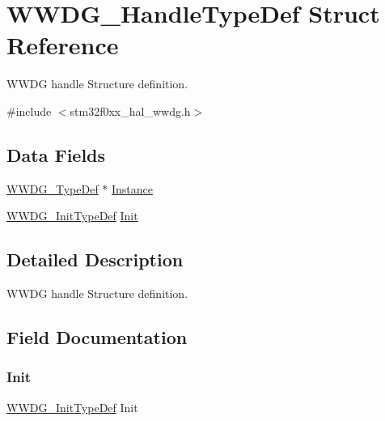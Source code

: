 \hypertarget{struct_w_w_d_g___handle_type_def}{}\section{W\+W\+D\+G\+\_\+\+Handle\+Type\+Def Struct Reference}
\label{struct_w_w_d_g___handle_type_def}


W\+W\+DG handle Structure definition.  




{\ttfamily \#include $<$stm32f0xx\+\_\+hal\+\_\+wwdg.\+h$>$}

\subsection*{Data Fields}
\begin{DoxyCompactItemize}
\item 
\hyperlink{struct_w_w_d_g___type_def}{W\+W\+D\+G\+\_\+\+Type\+Def} $\ast$ \hyperlink{struct_w_w_d_g___handle_type_def_adaefc2f8b1848fb56b27cb8e2ff17eec}{Instance}
\item 
\hyperlink{struct_w_w_d_g___init_type_def}{W\+W\+D\+G\+\_\+\+Init\+Type\+Def} \hyperlink{struct_w_w_d_g___handle_type_def_a1eeec8543293788149395f188390809d}{Init}
\end{DoxyCompactItemize}


\subsection{Detailed Description}
W\+W\+DG handle Structure definition. 

\subsection{Field Documentation}
\mbox{\label{struct_w_w_d_g___handle_type_def_a1eeec8543293788149395f188390809d}} 
\subsubsection{\texorpdfstring{Init}{Init}}
{\footnotesize\ttfamily \hyperlink{struct_w_w_d_g___init_type_def}{W\+W\+D\+G\+\_\+\+Init\+Type\+Def} Init}

